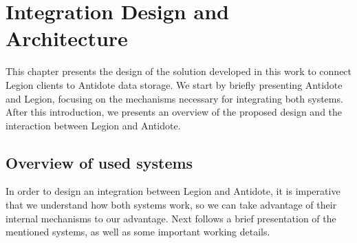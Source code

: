 \chapter{Integration Design and Architecture}
\label{cha:integration_design_and_architecture}

This chapter presents the design of the solution developed in this work to connect Legion clients to Antidote data storage. We start by briefly presenting Antidote and Legion, focusing on the mechanisms necessary for integrating both systems. After this introduction, we presents an overview of the proposed design and the interaction between Legion and Antidote.

\section{Overview of used systems}
\label{sec:system_introduction}
In order to design an integration between Legion and Antidote, it is imperative that we understand how both systems work, so we can take advantage of their internal mechanisms to our advantage. Next follows a brief presentation of the mentioned systems, as well as some important working details.

